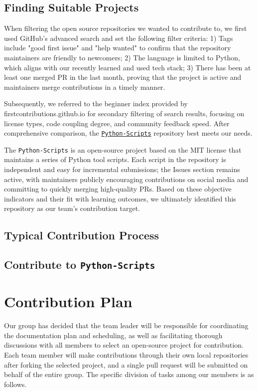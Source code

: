 \documentclass[12pt]{article}
\begin{document}
\subsection{Finding Suitable Projects}
When filtering the open source repositories we wanted to contribute to, we first used GitHub's advanced search and set the following filter criteria: 1) Tags include "good first issue" and "help wanted" to confirm that the repository maintainers are friendly to newcomers; 2) The language is limited to Python, which aligns with our recently learned and used tech stack; 3) There has been at least one merged PR in the last month, proving that the project is active and maintainers merge contributions in a timely manner. 

Subsequently, we referred to the beginner index provided by firstcontributions.github.io for secondary filtering of search results, focusing on license types, code coupling degree, and community feedback speed. After comprehensive comparison, the \href{https://github.com/DhanushNehru/Python-Scripts}{\texttt{Python-Scripts}} repository best meets our needs. 

The \texttt{Python-Scripts} is an open-source project based on the MIT license that maintains a series of Python tool scripts. Each script in the repository is independent and easy for incremental submissions; the Issues section remains active, with maintainers publicly encouraging contributions on social media and committing to quickly merging high-quality PRs. Based on these objective indicators and their fit with learning outcomes, we ultimately identified this repository as our team's contribution target.


\subsection{Typical Contribution Process}


\subsection{Contribute to \texttt{Python-Scripts}}



\section{Contribution Plan}

Our group has decided that the team leader will be responsible for coordinating the documentation plan and scheduling, as well as facilitating thorough discussions with all members to select an open-source project for contribution. Each team member will make contributions through their own local repositories after forking the selected project, and a single pull request will be submitted on behalf of the entire group. The specific division of tasks among our members is as follows.
\end{document}
